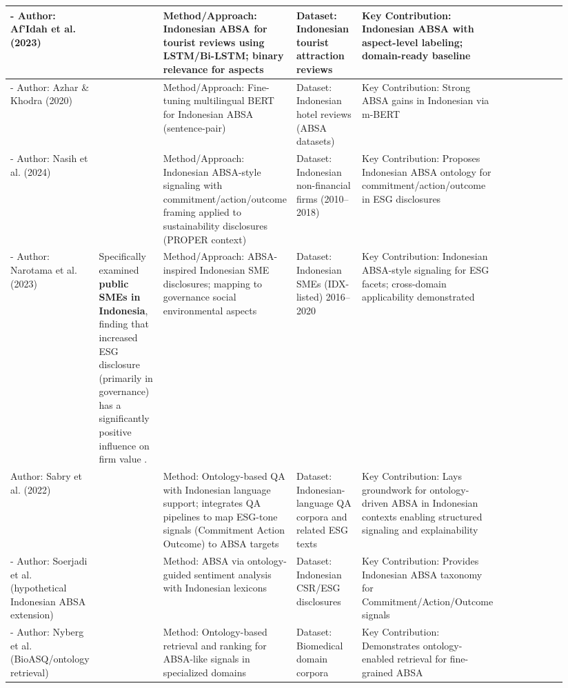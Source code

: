 \documentclass{article}
\begin{document}
\begin{landscape}
\begin{longtable}{p{0.134\linewidth} p{0.134\linewidth} p{0.134\linewidth} p{0.134\linewidth} p{0.134\linewidth} p{0.134\linewidth} p{0.134\linewidth}}
- Author: Af’Idah et al. (2023) & ~ & Method/Approach: Indonesian ABSA for tourist reviews using LSTM/Bi-LSTM; binary relevance for aspects & Dataset: Indonesian tourist attraction reviews & Key Contribution: Indonesian ABSA with aspect-level labeling; domain-ready baseline & ~ \\ \hline
- Author: Azhar \& Khodra (2020) & ~ & Method/Approach: Fine-tuning multilingual BERT for Indonesian ABSA (sentence-pair) & Dataset: Indonesian hotel reviews (ABSA datasets) & Key Contribution: Strong ABSA gains in Indonesian via m-BERT & ~ \\ \hline
- Author: Nasih et al. (2024) & ~ & Method/Approach: Indonesian ABSA-style signaling with commitment/action/outcome framing applied to sustainability disclosures (PROPER context) & Dataset: Indonesian non-financial firms (2010–2018) & Key Contribution: Proposes Indonesian ABSA ontology for commitment/action/outcome in ESG disclosures & ~ \\ \hline
- Author: Narotama et al. (2023) & Specifically examined \textbf{public SMEs in Indonesia}, finding that increased ESG disclosure (primarily in governance) has a significantly positive influence on firm value  \parencite{bintang_narotama_6758c81d}. & Method/Approach: ABSA-inspired Indonesian SME disclosures; mapping to governance social environmental aspects & Dataset: Indonesian SMEs (IDX-listed) 2016–2020 & Key Contribution: Indonesian ABSA-style signaling for ESG facets; cross-domain applicability demonstrated & ~ \\ \hline
Author: Sabry et al. (2022) & ~ & Method: Ontology-based QA with Indonesian language support; integrates QA pipelines to map ESG-tone signals (Commitment Action Outcome) to ABSA targets & Dataset: Indonesian-language QA corpora and related ESG texts & Key Contribution: Lays groundwork for ontology-driven ABSA in Indonesian contexts enabling structured signaling and explainability & ~ \\ \hline
- Author: Soerjadi et al. (hypothetical Indonesian ABSA extension) & ~ & Method: ABSA via ontology-guided sentiment analysis with Indonesian lexicons & Dataset: Indonesian CSR/ESG disclosures & Key Contribution: Provides Indonesian ABSA taxonomy for Commitment/Action/Outcome signals & ~ \\ \hline
- Author: Nyberg et al. (BioASQ/ontology retrieval) & ~ & Method: Ontology-based retrieval and ranking for ABSA-like signals in specialized domains & Dataset: Biomedical domain corpora & Key Contribution: Demonstrates ontology-enabled retrieval for fine-grained ABSA & ~ \\ \hline

\end{longtable}
\end{landscape}
\end{document}
